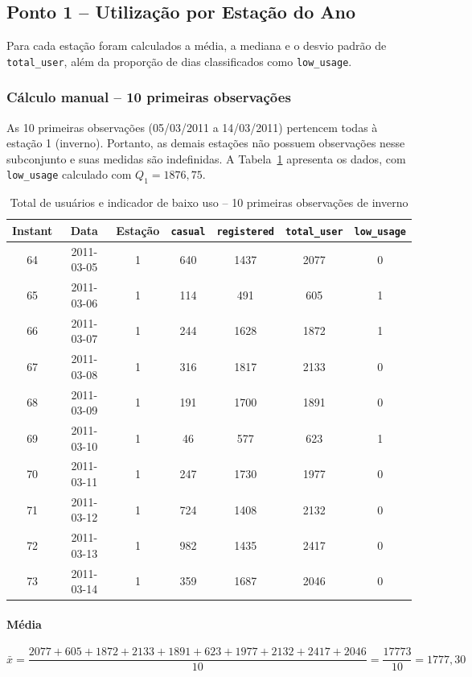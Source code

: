 \documentclass[10pt, a4paper]{article}
\begin{document}
\subsection{Ponto 1 -- Utilização por Estação do Ano}

Para cada estação foram calculados a média, a mediana e o desvio padrão de \texttt{total\_user}, além da proporção de dias classificados como \texttt{low\_usage}.

\subsubsection{Cálculo manual -- 10 primeiras observações}

As 10 primeiras observações (05/03/2011 a 14/03/2011) pertencem todas à estação 1 (inverno). Portanto, as demais estações não possuem observações nesse subconjunto e suas medidas são indefinidas. A Tabela~\ref{tab:inverno-10} apresenta os dados, com \texttt{low\_usage} calculado com $Q_1 = 1876{,}75$.

\begin{table}[!htb]
\centering
\caption{Total de usuários e indicador de baixo uso -- 10 primeiras observações de inverno}
\label{tab:inverno-10}
\begin{tabular}{ccccccc}
\hline
\textbf{Instant} & \textbf{Data} & \textbf{Estação} & \textbf{\texttt{casual}} & \textbf{\texttt{registered}} & \textbf{\texttt{total\_user}} & \textbf{\texttt{low\_usage}} \\
\hline
64 & 2011-03-05 & 1 & 640 & 1437 & 2077 & 0 \\
65 & 2011-03-06 & 1 & 114 & 491  & 605  & 1 \\
66 & 2011-03-07 & 1 & 244 & 1628 & 1872 & 1 \\
67 & 2011-03-08 & 1 & 316 & 1817 & 2133 & 0 \\
68 & 2011-03-09 & 1 & 191 & 1700 & 1891 & 0 \\
69 & 2011-03-10 & 1 & 46  & 577  & 623  & 1 \\
70 & 2011-03-11 & 1 & 247 & 1730 & 1977 & 0 \\
71 & 2011-03-12 & 1 & 724 & 1408 & 2132 & 0 \\
72 & 2011-03-13 & 1 & 982 & 1435 & 2417 & 0 \\
73 & 2011-03-14 & 1 & 359 & 1687 & 2046 & 0 \\
\hline
\end{tabular}
\end{table}

\paragraph{Média}
\[
\bar{x} = \frac{2077 + 605 + 1872 + 2133 + 1891 + 623 + 1977 + 2132 + 2417 + 2046}{10} = \frac{17773}{10} = 1777{,}30
\]
\end{document}
